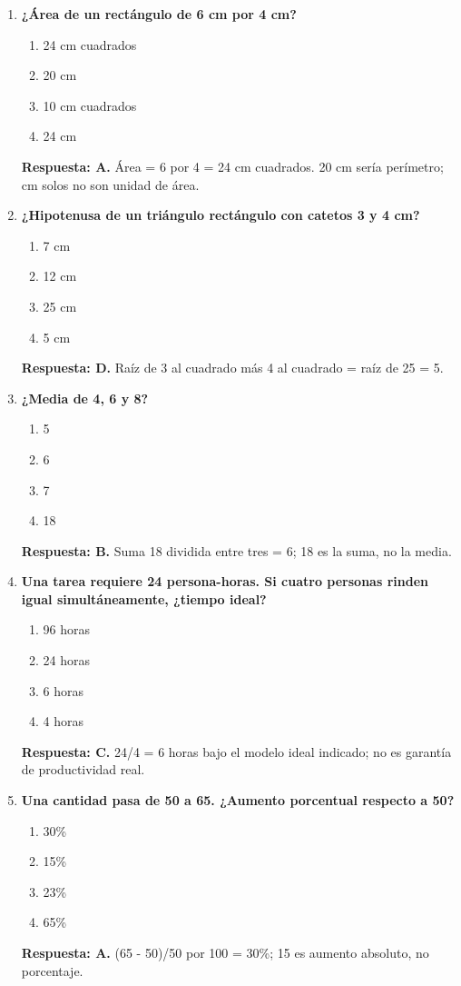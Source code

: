 \begin{enumerate}
\begin{enumerate}[label=\Alph*)]
\end{enumerate}
\textbf{Respuesta: C.} Tres favorables entre cinco posibles: 3/5; 3/2 excede uno.
\item\textbf{¿Área de un rectángulo de 6 cm por 4 cm?}
\begin{enumerate}[label=\Alph*)]
\item 24 cm cuadrados
\item 20 cm
\item 10 cm cuadrados
\item 24 cm
\end{enumerate}
\textbf{Respuesta: A.} Área = 6 por 4 = 24 cm cuadrados. 20 cm sería perímetro; cm solos no son unidad de área.
\item\textbf{¿Hipotenusa de un triángulo rectángulo con catetos 3 y 4 cm?}
\begin{enumerate}[label=\Alph*)]
\item 7 cm
\item 12 cm
\item 25 cm
\item 5 cm
\end{enumerate}
\textbf{Respuesta: D.} Raíz de 3 al cuadrado más 4 al cuadrado = raíz de 25 = 5.
\item\textbf{¿Media de 4, 6 y 8?}
\begin{enumerate}[label=\Alph*)]
\item 5
\item 6
\item 7
\item 18
\end{enumerate}
\textbf{Respuesta: B.} Suma 18 dividida entre tres = 6; 18 es la suma, no la media.
\item\textbf{Una tarea requiere 24 persona-horas. Si cuatro personas rinden igual simultáneamente, ¿tiempo ideal?}
\begin{enumerate}[label=\Alph*)]
\item 96 horas
\item 24 horas
\item 6 horas
\item 4 horas
\end{enumerate}
\textbf{Respuesta: C.} 24/4 = 6 horas bajo el modelo ideal indicado; no es garantía de productividad real.
\item\textbf{Una cantidad pasa de 50 a 65. ¿Aumento porcentual respecto a 50?}
\begin{enumerate}[label=\Alph*)]
\item 30\%
\item 15\%
\item 23\%
\item 65\%
\end{enumerate}
\textbf{Respuesta: A.} (65 - 50)/50 por 100 = 30\%; 15 es aumento absoluto, no porcentaje.
\end{enumerate}

